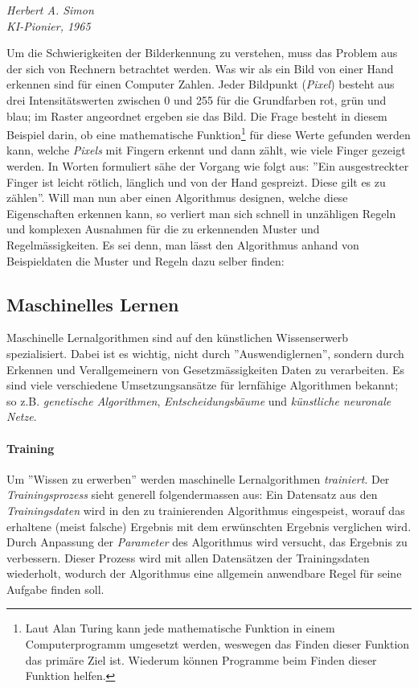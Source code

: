 \epigraph{\cite{hasimon}}{\textit{Herbert A. Simon\\ \textit{KI}-Pionier, 1965}}

Um die Schwierigkeiten der Bilderkennung zu verstehen, muss das Problem aus der sich von Rechnern betrachtet werden. Was wir als ein Bild von einer Hand erkennen sind für einen Computer Zahlen. Jeder Bildpunkt (\textit{Pixel}) besteht aus drei Intensitätswerten zwischen 0 und 255 für die Grundfarben rot, grün und blau; im Raster angeordnet ergeben sie das Bild. Die Frage besteht in diesem Beispiel darin, ob eine mathematische Funktion\footnote{Laut Alan Turing kann jede mathematische Funktion in einem Computerprogramm umgesetzt werden\cite{alanturing}, weswegen das Finden dieser Funktion das primäre Ziel ist. Wiederum können Programme beim Finden dieser Funktion helfen.} für diese Werte gefunden werden kann, welche \textit{Pixels} mit Fingern erkennt und dann zählt, wie viele Finger gezeigt werden. In Worten formuliert sähe der Vorgang wie folgt aus: ''Ein ausgestreckter Finger ist leicht rötlich, länglich und von der Hand gespreizt. Diese gilt es zu zählen''. Will man nun aber einen Algorithmus designen, welche diese Eigenschaften erkennen kann, so verliert man sich schnell in unzähligen Regeln und komplexen Ausnahmen für die zu erkennenden Muster und Regelmässigkeiten. Es sei denn, man lässt den Algorithmus anhand von Beispieldaten die Muster und Regeln dazu selber finden:

\subsection{Maschinelles Lernen}\label{cha:theo:ml}
Maschinelle Lernalgorithmen sind auf den künstlichen Wissenserwerb spezialisiert. Dabei ist es wichtig, nicht durch ''Auswendiglernen'', sondern durch Erkennen und Verallgemeinern von Gesetzmässigkeiten Daten zu verarbeiten. Es sind viele verschiedene Umsetzungsansätze für lernfähige Algorithmen bekannt; so z.B. \textit{genetische Algorithmen}, \textit{Entscheidungsbäume} und \textit{künstliche neuronale Netze}.

\paragraph{Training} Um ''Wissen zu erwerben'' werden maschinelle Lernalgorithmen \textit{trainiert}. Der \textit{Trainingsprozess} sieht generell folgendermassen aus: Ein Datensatz aus den \textit{Trainingsdaten} wird in den zu trainierenden Algorithmus eingespeist, worauf das erhaltene (meist falsche) Ergebnis mit dem erwünschten Ergebnis verglichen wird. Durch Anpassung der \textit{Parameter} des Algorithmus wird versucht, das Ergebnis zu verbessern. Dieser Prozess wird mit allen Datensätzen der Trainingsdaten wiederholt, wodurch der Algorithmus eine allgemein anwendbare Regel für seine Aufgabe finden soll.


